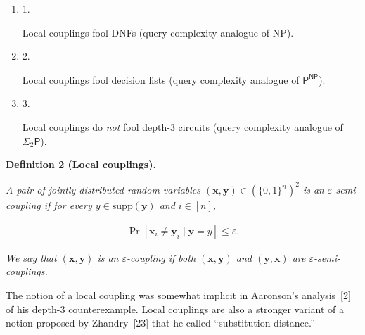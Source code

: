 \begin{enumerate}


\item[] 
1. 


Local couplings fool DNFs (query complexity analogue of NP).\par





\item[] 
2. 


Local couplings fool decision lists (query complexity analogue of $\textsf{P}^{\textsf{NP}}$).\par





\item[] 
3. 


Local couplings do \emph{not} fool depth-3 circuits (query complexity analogue of $\Sigma_{2}\textsf{P}$).\par





\end{enumerate}





\par\medskip\noindent\textbf{
\textbf{Definition 2}\textbf{ }(Local couplings)\textbf{.}
}\par



\emph{A pair of jointly distributed random variables $(\bm{x},\bm{y})\in(\{0,1\}^{n})^{2}$ is an $\varepsilon$-semi-coupling if for every $y\in\mathrm{supp}(\bm{y})$ and $i\in[n]$,}\par


\[\begin{gathered}
\Pr[\bm{x}_{i}\neq\bm{y}_{i}\mid\bm{y}=y]\leq\varepsilon.
\end{gathered}\]


\emph{We say that $(\bm{x},\bm{y})$ is an
$\varepsilon$-coupling if both $(\bm{x},\bm{y})$ and $(\bm{y},\bm{x})$ are $\varepsilon$-semi-couplings.}\par






The notion of a local coupling was somewhat implicit in Aaronson’s analysis [2] of his depth-3 counterexample. Local couplings are also a stronger variant of a notion proposed by Zhandry [23] that he called “substitution distance.”\par




